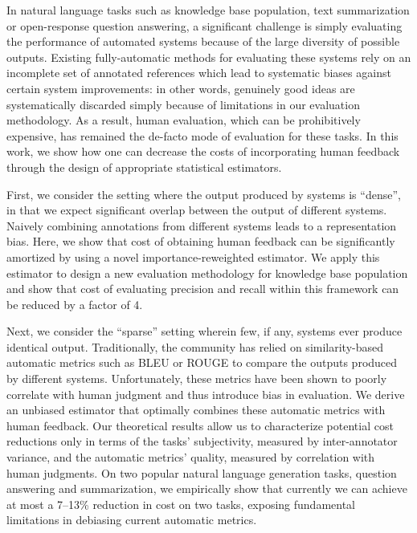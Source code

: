 In natural language tasks such as knowledge base population, text summarization or open-response question answering, a significant challenge is simply evaluating the performance of automated systems because of the large diversity of possible outputs.
Existing fully-automatic methods for evaluating these systems rely on an incomplete set of annotated references which lead to systematic biases against certain system improvements: in other words, genuinely good ideas are systematically discarded simply because of limitations in our evaluation methodology.
As a result, human evaluation, which can be prohibitively expensive, has remained the de-facto mode of evaluation for these tasks.
In this work, we show how one can decrease the costs of incorporating human feedback through the design of appropriate statistical estimators. 
%

First, we consider the setting where the output produced by systems is ``dense'', in that we expect significant overlap between the output of different systems. 
Naively combining annotations from different systems leads to a representation bias.
Here, we show that cost of obtaining human feedback can be significantly amortized by using a novel importance-reweighted estimator.  
We apply this estimator to design a new evaluation methodology for knowledge base population and show that cost of evaluating precision and recall within this framework can be reduced by a factor of 4.

Next, we consider the ``sparse'' setting wherein few, if any, systems ever produce identical output.
Traditionally, the community has relied on similarity-based automatic metrics such as BLEU or ROUGE to compare the outputs produced by different systems.
Unfortunately, these metrics have been shown to poorly correlate with human judgment and thus introduce bias in evaluation.
We derive an unbiased estimator that optimally combines these automatic metrics with human feedback.
Our theoretical results allow us to characterize potential cost reductions only in terms of the tasks' subjectivity, measured by inter-annotator variance, and the automatic metrics' quality, measured by correlation with human judgments.
On two popular natural language generation tasks, question answering and summarization, we empirically show that currently we can achieve at most a 7--13\% reduction in cost on two tasks, exposing fundamental limitations in debiasing current automatic metrics.

